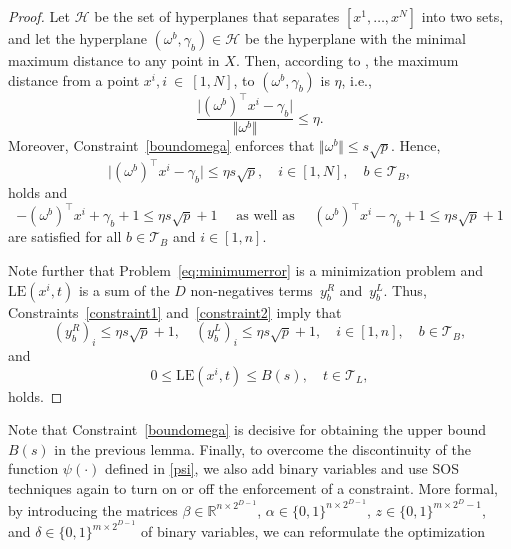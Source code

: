 \documentclass[a4paper,american,reqno]{amsart}
\newcommand{\LE}{\text{LE}}
\begin{document}
\begin{proof} Let $\mathcal{H}$ be the set of hyperplanes that separates $[x^1,
  \dots, x^N] $ into two sets, and let the hyperplane $(\omega^b,
  \gamma_b) \in \mathcal{H}$ be the hyperplane with the minimal
  maximum distance to any point in $X$. Then, according to
  \textcite{maximumdist}, the maximum distance from a point $x^i,
  i~\in~[1,N]$, to $(\omega^b, \gamma_b)$  is $\eta$, i.e.,
  \begin{equation*}
    \dfrac{\vert (\omega^b)^\top x^i - \gamma_b \vert}{\Vert
      \omega^b\Vert } \leq \eta.
  \end{equation*}
  Moreover, Constraint~\eqref{boundomega} enforces that $\Vert
  \omega^b\Vert \leq s\sqrt{p}$.
  Hence,
  \begin{equation*}
    \vert (\omega^b)^\top x^i - \gamma_b \vert \leq \eta s \sqrt{p},
    \quad i \in [1,N], \quad b \in  \mathcal{T}_B,
  \end{equation*}
  holds and
  \begin{equation*}
    -\left(\omega^b\right)^\top x^i +  \gamma_b +1 \leq  \eta s
    \sqrt{p} +1 \quad \text{ as well as } \quad
    \left(\omega^b\right)^\top x^i  -\gamma_b +1 \leq  \eta s \sqrt{p}
    +1
  \end{equation*}
  are satisfied for all $b \in \mathcal{T}_B$ and $i \in [1,n]$.

  Note further that Problem~\eqref{eq:minimumerror} is a minimization
  problem and $\LE(x^i, t)$ is a sum of the $D$ non-negatives
  terms~$y_b^R$ and~$y_b^L$.
  Thus, Constraints~\eqref{constraint1} and~\eqref{constraint2} imply
  that
  \begin{equation*}
    (y_b^R)_i \leq \eta s \sqrt{p} +1, \quad (y_b^L)_i \leq \eta s
    \sqrt{p} +1, \quad  i \in [1,n], \quad b \in  \mathcal{T}_B,
  \end{equation*}
  and
  \begin{equation*}
    0 \leq \LE(x^i, t) \leq  B(s), \quad t \in \mathcal{T}_L,
  \end{equation*}
  holds.
\end{proof}
Note that Constraint~\eqref{boundomega} is decisive for obtaining the
upper bound $B(s)$ in the previous lemma.
Finally, to overcome the discontinuity of the function $\psi(\cdot)$
defined in \eqref{psi}, we also add binary variables and use SOS
techniques again to turn on or off the enforcement of a constraint.
More formal, by introducing the matrices $\beta \in
\mathbb{R}^{n\times 2^{D-1}}$, $\alpha \in \{0,1\}^{n\times 2^{D-1}}$,
$z \in \{0,1\}^{m\times 2^{D}-1}$, and $\delta \in \{0,1\}^{m \times
  2^{D-1}}$ of binary variables, we can reformulate the optimization
\end{document}
